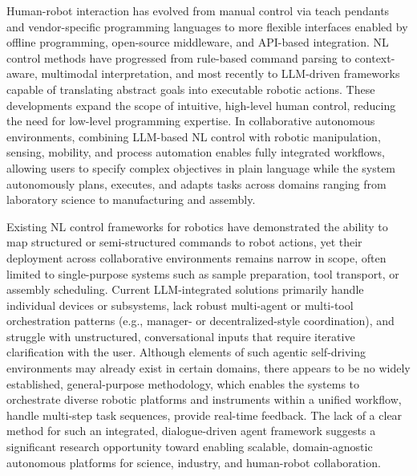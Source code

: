 
Human-robot interaction has evolved from manual control via teach pendants and vendor-specific programming languages to more flexible interfaces enabled by offline programming, open-source middleware, and API-based integration. NL control methods have progressed from rule-based command parsing to context-aware, multimodal interpretation, and most recently to LLM-driven frameworks capable of translating abstract goals into executable robotic actions. These developments expand the scope of intuitive, high-level human control, reducing the need for low-level programming expertise. In collaborative autonomous environments, combining LLM-based NL control with robotic manipulation, sensing, mobility, and process automation enables fully integrated workflows, allowing users to specify complex objectives in plain language while the system autonomously plans, executes, and adapts tasks across domains ranging from laboratory science to manufacturing and assembly.

Existing NL control frameworks for robotics have demonstrated the ability to map structured or semi-structured commands to robot actions, yet their deployment across collaborative environments remains narrow in scope, often limited to single-purpose systems such as sample preparation, tool transport, or assembly scheduling. Current LLM-integrated solutions primarily handle individual devices or subsystems, lack robust multi-agent or multi-tool orchestration patterns (e.g., manager- or decentralized-style coordination), and struggle with unstructured, conversational inputs that require iterative clarification with the user. Although elements of such agentic self-driving environments may already exist in certain domains, there appears to be no widely established, general-purpose methodology, which enables the systems to orchestrate diverse robotic platforms and instruments within a unified workflow, handle multi-step task sequences, provide real-time feedback. The lack of a clear method for such an integrated, dialogue-driven agent framework suggests a significant research opportunity toward enabling scalable, domain-agnostic autonomous platforms for science, industry, and human-robot collaboration.
